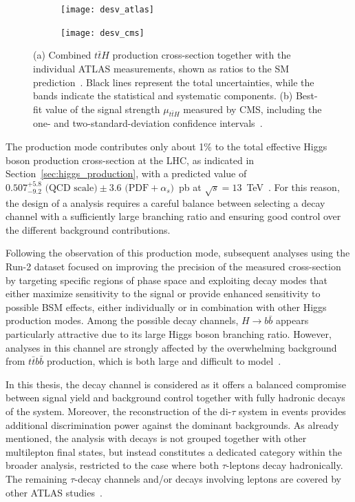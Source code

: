 \begin{figure}[htbp]
  \centering
  \begin{subfigure}[b]{0.495\textwidth}
    \centering
    \texttt{[image: desv\_atlas]}
    \caption{}
    \label{fig:tth_obs_atlas}
  \end{subfigure}%
  \hfill
  \begin{subfigure}[b]{0.495\textwidth}
    \centering
    \texttt{[image: desv\_cms]}
    \caption{}
    \label{fig:tth_obs_cms}
  \end{subfigure}
  
  \caption{(a) Combined $t\bar{t}H$ production cross-section together with the individual ATLAS measurements, shown as ratios to the SM prediction~\cite{ATLAS:2018mme}. Black lines represent the total uncertainties, while the bands indicate the statistical and systematic components. (b) Best-fit value of the signal strength $\mu_{t\bar{t}H}$ measured by CMS, including the one- and two-standard-deviation confidence intervals~\cite{CMS:2018uxb}.}
  \label{fig:tth_obs}
\end{figure}


  The \ttH production mode contributes only about 1\% to the total effective Higgs boson production cross-section at the LHC, as indicated in Section~\ref{sec:higgs_production}, with a predicted value of $0.507^{+5.8}_{-9.2} \text{ (QCD scale)} \pm 3.6 \text{ (PDF}+\alpha_{s})$~pb at $\sqrt{s}=13$~TeV~\cite{https://doi.org/10.23731/cyrm-2017-002}. For this reason, the design of a \ttH analysis requires a careful balance between selecting a decay channel with a sufficiently large branching ratio and ensuring good control over the different background contributions.  

  Following the observation of this production mode, subsequent analyses using the Run-2 dataset focused on improving the precision of the measured cross-section by targeting specific regions of phase space and exploiting decay modes that either maximize sensitivity to the signal or provide enhanced sensitivity to possible BSM effects, either individually or in combination with other Higgs production modes. Among the possible decay channels, $H \to b\bar{b}$ appears particularly attractive due to its large Higgs boson branching ratio. However, \ttH analyses in this channel are strongly affected by the overwhelming background from $t\bar{t}b\bar{b}$ production, which is both large and difficult to model~\cite{Aad:2904447}.  
  
  In this thesis, the \htautau decay channel is considered as it offers a balanced compromise between signal yield and background control together with fully hadronic decays of the \ttbar system. Moreover, the reconstruction of the di-$\tau$ system in \htautau events provides additional discrimination power against the dominant backgrounds. As already mentioned, the \ttH analysis with \htautau decays is not grouped together with other multilepton final states, but instead constitutes a dedicated category within the broader \htautau analysis, restricted to the case where both $\tau$-leptons decay hadronically. The remaining $\tau$-decay channels and/or \ttbar decays involving leptons are covered by other ATLAS studies~\cite{PhysRevD.97.072003}.  
  

